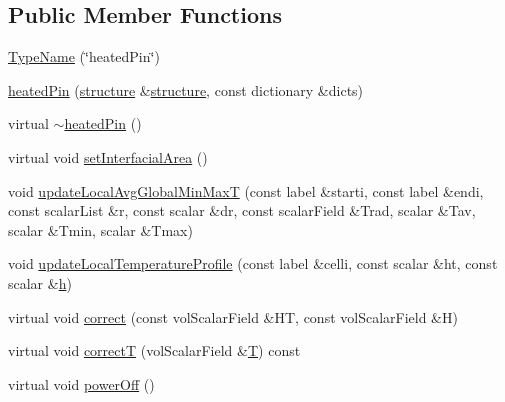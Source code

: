 \subsection*{Public Member Functions}
\begin{DoxyCompactItemize}
\item 
\hyperlink{classFoam_1_1powerModels_1_1heatedPin_a687fb4863571a02ff1d34b73d8b7fd4d}{Type\+Name} (\char`\"{}heated\+Pin\char`\"{})
\item 
\hyperlink{classFoam_1_1powerModels_1_1heatedPin_a5df612853023ce36358872f98ac1fbe2}{heated\+Pin} (\hyperlink{classFoam_1_1structure}{structure} \&\hyperlink{classFoam_1_1structure}{structure}, const dictionary \&dicts)
\item 
virtual \hyperlink{classFoam_1_1powerModels_1_1heatedPin_af63b7fab9226364ac337978b3d57312f}{$\sim$heated\+Pin} ()
\item 
virtual void \hyperlink{classFoam_1_1powerModels_1_1heatedPin_a8fc8c05c610e629783c80688340f8db4}{set\+Interfacial\+Area} ()
\item 
void \hyperlink{classFoam_1_1powerModels_1_1heatedPin_a156a2a794e9317591692be62c0a33299}{update\+Local\+Avg\+Global\+Min\+MaxT} (const label \&starti, const label \&endi, const scalar\+List \&r, const scalar \&dr, const scalar\+Field \&Trad, scalar \&Tav, scalar \&Tmin, scalar \&Tmax)
\item 
void \hyperlink{classFoam_1_1powerModels_1_1heatedPin_aebceb9d61655d7851a7ab3a7710164ea}{update\+Local\+Temperature\+Profile} (const label \&celli, const scalar \&ht, const scalar \&\hyperlink{createFieldRefs_8H_a52f2dcc529f3c146980b0ce8dc591698}{h})
\item 
virtual void \hyperlink{classFoam_1_1powerModels_1_1heatedPin_a08cf6ccfed7f616074be223f0d2379f3}{correct} (const vol\+Scalar\+Field \&HT, const vol\+Scalar\+Field \&H)
\item 
virtual void \hyperlink{classFoam_1_1powerModels_1_1heatedPin_a9f9875fb3a22007b3cb6ef9f59821c9c}{correctT} (vol\+Scalar\+Field \&\hyperlink{EEqn__1pl_8H_ad0f94aa7ea43d4be0bae24e3a89aad0c}{T}) const
\item 
virtual void \hyperlink{classFoam_1_1powerModels_1_1heatedPin_a2497dfe95d3876d598347df587b0ccc7}{power\+Off} ()
\end{DoxyCompactItemize}
